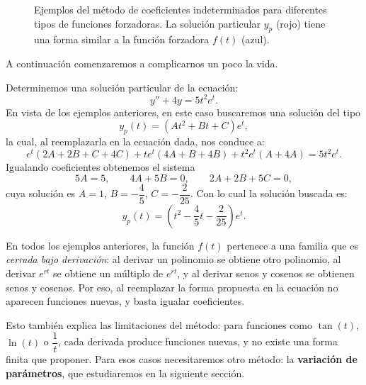 \begin{figure}[h!]
\begin{subfigure}[b]{0.32\textwidth}
    \end{subfigure}
    \hfill
    \begin{subfigure}[b]{0.32\textwidth}
        \centering
    \end{subfigure}
    \caption{Ejemplos del m\'etodo de coeficientes indeterminados para diferentes tipos de funciones forzadoras. La soluci\'on particular $y_p$ (rojo) tiene una forma similar a la funci\'on forzadora $f(t)$ (azul).}
    \label{fig:coeficientes_indeterminados}
\end{figure}

A continuaci\'on comenzaremos a complicarnos un poco la vida.

\begin{example}
    Determinemos una soluci\'on particular de la ecuaci\'on:
    \[
    y''+4y=5t^2e^t.
    \]
    En vista de los ejemplos anteriores, en este caso buscaremos una soluci\'on del tipo
    \[
    y_p(t)=(At^2+Bt+C)e^{t},
    \]
    la cual, al reemplazarla en la ecuaci\'on dada, nos conduce a:
    \[
    e^t(2A+2B+C+4C)+te^t(4A+B+4B)+t^2e^t(A+4A)=5t^2e^t.
    \]
    Igualando coeficientes obtenemos el sistema
    \[
    5A=5,\qquad 4A+5B=0,\qquad 2A+2B+5C=0,
    \]
    cuya soluci\'on es $A=1$, $B=-\dfrac{4}{5}$, $C=-\dfrac{2}{25}$. Con lo cual la soluci\'on buscada es:
    \[
    y_p(t)=\left(t^2-\dfrac{4}{5}t-\dfrac{2}{25}\right)e^t.
    \]
\end{example}

\begin{remark}
    En todos los ejemplos anteriores, la funci\'on $f(t)$ pertenece a una familia que es \emph{cerrada bajo derivaci\'on}: al derivar un polinomio se obtiene otro polinomio, al derivar $e^{rt}$ se obtiene un m\'ultiplo de $e^{rt}$, y al derivar senos y cosenos se obtienen senos y cosenos. Por eso, al reemplazar la forma propuesta en la ecuaci\'on no aparecen funciones nuevas, y basta igualar coeficientes.

    Esto tambi\'en explica las limitaciones del m\'etodo: para funciones como $\tan(t)$, $\ln(t)$ o $\dfrac{1}{t}$, cada derivada produce funciones nuevas, y no existe una forma finita que proponer. Para esos casos necesitaremos otro m\'etodo: la \textbf{variaci\'on de par\'ametros}, que estudiaremos en la siguiente secci\'on.
\end{remark}

